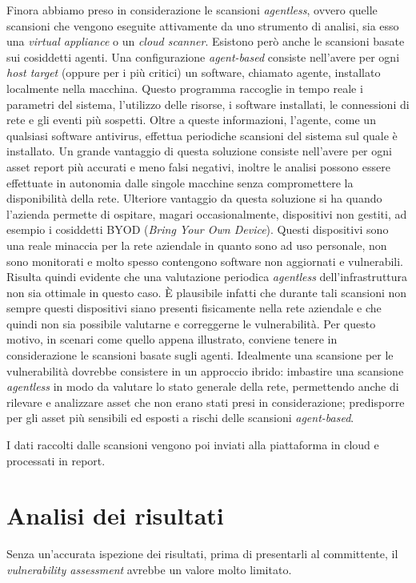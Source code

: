 \documentclass[target=bach,aauheader=]{thud}
\begin{document}
Finora abbiamo preso in considerazione le scansioni \textit{agentless}, ovvero quelle scansioni che vengono eseguite attivamente da uno strumento di analisi, sia esso una \textit{virtual appliance} o un \textit{cloud scanner}. Esistono però anche le scansioni basate sui cosiddetti agenti. Una configurazione \textit{agent-based} consiste nell’avere per ogni \textit{host target} (oppure per i più critici) un software, chiamato agente, installato localmente nella macchina. Questo programma raccoglie in tempo reale i parametri del sistema, l’utilizzo delle risorse, i software installati, le connessioni di rete e gli eventi più sospetti. Oltre a queste informazioni, l’agente, come un qualsiasi software antivirus, effettua periodiche scansioni del sistema sul quale è installato. Un grande vantaggio di questa soluzione consiste nell’avere per ogni asset report più accurati e meno falsi negativi, inoltre le analisi possono essere effettuate in autonomia dalle singole macchine senza compromettere la disponibilità della rete. Ulteriore vantaggio da questa soluzione si ha quando l’azienda permette di ospitare, magari occasionalmente, dispositivi non gestiti, ad esempio i cosiddetti BYOD (\textit{Bring Your Own Device}). Questi dispositivi sono una reale minaccia per la rete aziendale in quanto sono ad uso personale, non sono monitorati e molto spesso contengono software non aggiornati e vulnerabili. Risulta quindi evidente che una valutazione periodica \textit{agentless} dell’infrastruttura non sia ottimale in questo caso. È plausibile infatti che durante tali scansioni non sempre questi dispositivi siano presenti fisicamente nella rete aziendale e che quindi non sia possibile valutarne e correggerne le vulnerabilità. Per questo motivo, in scenari come quello appena illustrato, conviene tenere in considerazione le scansioni basate sugli agenti. Idealmente una scansione per le vulnerabilità dovrebbe consistere in un approccio ibrido: imbastire una scansione \textit{agentless} in modo da valutare lo stato generale della rete, permettendo anche di rilevare e analizzare asset che non erano stati presi in considerazione; predisporre per gli asset più sensibili ed esposti a rischi delle scansioni \textit{agent-based}.

I dati raccolti dalle scansioni vengono poi inviati alla piattaforma in cloud e processati in report.

\section{Analisi dei risultati}
Senza un’accurata ispezione dei risultati, prima di presentarli al committente, il \textit{vulnerability assessment} avrebbe un valore molto limitato.
\end{document}
